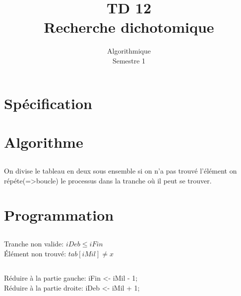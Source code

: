 \documentclass{article}
\title{TD 12\\ Recherche dichotomique}
\date{Algorithmique\\ Semestre 1}
\begin{document}
	\maketitle
	\section{Spécification}
		\subsection{}
			
		\subsection{}
			
	\section{Algorithme}
		\subsection{}
			On divise le tableau en deux sous ensemble si on n'a pas trouvé l'élément on répéte(=>boucle) le processus dans la tranche où il peut se trouver.
		\subsection{}
			
	\section{Programmation}
		\subsection{}
			Tranche non valide:  $iDeb \leq iFin$\\
			Élément non trouvé:  $tab[iMil] \neq x$
		\subsection{}
			Réduire à la partie gauche: iFin <- iMil - 1;\\
			Réduire à la partie droite: iDeb <- iMil + 1;	
		\subsection{}
			
\end{document}
